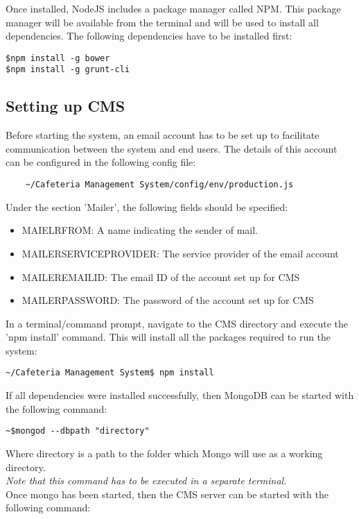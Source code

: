 \documentclass[12pt]{article}
\begin{document}
Once installed, NodeJS includes a package manager called NPM. This package manager will be available from the terminal and will be used to install all dependencies. The following dependencies have to be installed first:
\begin{verbatim}
$npm install -g bower
$npm install -g grunt-cli
\end{verbatim}

\subsection{Setting up CMS}
Before starting the system, an email account has to be set up to facilitate communication between the system and end users. The details of this account can be configured in the following config file:
\begin{verbatim}
	~/Cafeteria Management System/config/env/production.js
\end{verbatim} 
Under the section 'Mailer', the following fields should be specified:\\
\begin{itemize}
\item MAIELR\textunderscore FROM: A name indicating the sender of mail.
\item MAILER\textunderscore SERVICE\textunderscore PROVIDER: The service provider of the email account
\item MAILER\textunderscore EMAIL\textunderscore ID: The email ID of the account set up for CMS
\item MAILER\textunderscore PASSWORD: The password of the account set up for CMS
\end{itemize}


In a terminal/command prompt, navigate to the CMS directory and execute the 'npm install' command. This will install all the packages required to run the system:
\begin{verbatim}
~/Cafeteria Management System$ npm install
\end{verbatim}

If all dependencies were installed successfully, then MongoDB can be started with the following command:
\begin{verbatim}
~$mongod --dbpath "directory"
\end{verbatim}

Where directory is a path to the folder which Mongo will use as a working directory.\\
{\em Note that this command has to be executed in a separate terminal.}\\
Once mongo has been started, then the CMS server can be started with the following command:\\
\end{document}
